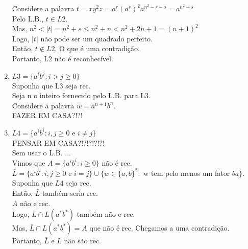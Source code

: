\documentclass{article}
\begin{document}
\begin{enumerate}
                Considere a palavra $ t = xy^2z = a^r(a^s)^2a^{n^2-r-s} = a^{n^2+s} $\\
                Pelo L.B., $ t \in L2 $.\\
                Mas, $ n^2 < |t| = n^2 + s \leq n^2 + n < n^2 + 2n + 1 = (n+1)^2 $\\
                Logo, $ |t| $ não pode ser um quadrado perfeito.\\
                Então, $ t \notin L2 $. O que é uma contradição.\\
                Portanto, L2 não é reconhecível.
        \item $ L3 = \{ a^ib^j : i > j \geq 0 \} $\\
                Suponha que L3 seja rec.\\
                Seja n o inteiro fornecido pelo L.B. para L3.\\
                Considere a palavra $w = a^{n+1}b^n $.\\
                FAZER EM CASA?!?!
        \item $ L4 = \{ a^ib^i : i,j \geq 0$ e $ i \neq j \} $ \\
                PENSAR EM CASA?!?!?!?!?!\\
                Sem usar o L.B. ...\\
                Vimos que $ A = \{ a^ib^i : i \geq 0 \} $ não é rec.\\
                $ \bar{L} = \{ a^ib^i : i,j \geq 0 $ e $ i = j \} \cup \{ w \in \{a,b\}^* : $ w tem pelo menos um fator $ ba \} $.\\
                Suponha que $ L4 $ seja rec.\\
                Então, $ \bar{L} $ também seria rec.\\
                $ A $ não e rec.\\
                Logo, $ \bar{L} \cap L(a^*b^*) $ também não e rec.\\
                Mas, $ \bar{L} \cap L(a^*b^*) = A$ que não é rec. Chegamos a uma contradição.\\
                Portanto, $ \bar{L} $ e $ L $ não são rec.\\
    \end{enumerate}
    
\end{document}
